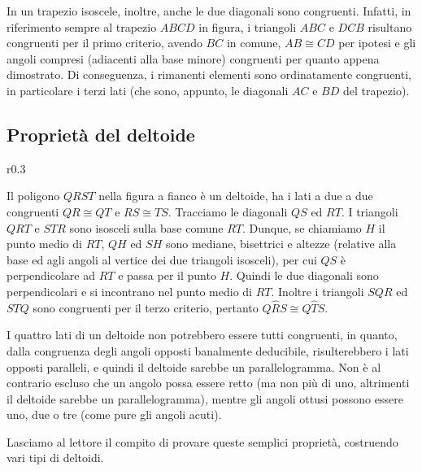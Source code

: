 In un trapezio isoscele, inoltre, anche le due diagonali sono 
congruenti. Infatti, in riferimento sempre al trapezio $ABCD$ in 
figura, i triangoli $ABC$ e $DCB$ risultano congruenti per il primo 
criterio, avendo $BC$ in comune, $AB\cong CD$ per ipotesi e gli 
angoli compresi (adiacenti alla base minore) congruenti per quanto 
appena dimostrato. Di conseguenza, i rimanenti elementi sono 
ordinatamente congruenti, in particolare i terzi lati (che sono, 
appunto, le diagonali $AC$ e $BD$ del trapezio).

\subsection{Proprietà del deltoide}

\begin{wrapfigure}{r}{0.3\textwidth}
	\centering
\end{wrapfigure}
Il poligono $QRST$ nella figura a fianco è un deltoide, ha i lati a 
due a due congruenti $QR\cong QT$ e $RS\cong TS$. Tracciamo le 
diagonali $QS$ ed $RT$. I triangoli $QRT$ e $STR$ sono isosceli sulla 
base comune $RT$. Dunque, se chiamiamo $H$ il punto medio di $RT$, 
$QH$ ed $SH$ sono mediane, bisettrici e altezze (relative alla base 
ed agli angoli al vertice dei due triangoli isosceli), per cui $QS$ è 
perpendicolare ad $RT$ e passa per il punto $H$. Quindi le due 
diagonali sono perpendicolari e si incontrano nel punto medio di 
$RT$. Inoltre i triangoli $SQR$ ed $STQ$ sono congruenti per il terzo 
criterio, pertanto $Q\widehat{R}S\cong Q\widehat{T}S$.

I quattro lati di un deltoide non potrebbero essere tutti congruenti, 
in quanto, dalla congruenza degli angoli opposti banalmente 
deducibile, risulterebbero i lati opposti paralleli, e quindi il 
deltoide sarebbe un parallelogramma. Non è al contrario escluso che 
un angolo possa essere retto (ma non più di uno, altrimenti il 
deltoide sarebbe un parallelogramma), mentre gli angoli ottusi possono 
essere uno, due o tre (come pure gli angoli acuti).

Lasciamo al lettore il compito di provare queste semplici proprietà, 
costruendo vari tipi di deltoidi.

